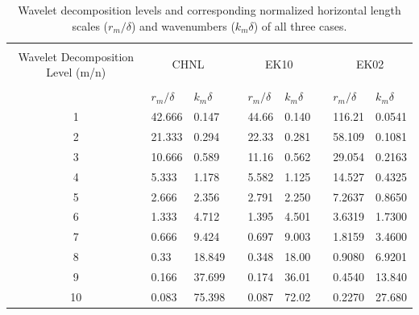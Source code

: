 \begin{table}
	  \caption{Wavelet decomposition levels and corresponding normalized horizontal length scales ($r_m/\delta$) and wavenumbers ($k_m\delta$) of all three cases.}	
	    \centering
		\begin{tabular}{cllllllll}
		\hline \hline\\
		Wavelet Decomposition Level (m/n) &  \multicolumn{2}{c}{CHNL} &  & \multicolumn{2}{c}{EK10} & & \multicolumn{2}{c}{EK02}\\
		\hline \\
		{}   & {$r_{m}/\delta$}   & {$k_m\delta$}  &   & {$r_{m}/\delta$}    & {$k_{m}\delta$} &  & {$r_{m}/\delta$}   & {$k_{m}\delta$} \\
		1  & 42.666 & 0.147   &   &  44.66    & 0.140  &  & 116.21    & 0.0541 \\ 
		2  & 21.333 & 0.294   &   &  22.33    & 0.281  &  & 58.109    & 0.1081 \\
		3  & 10.666 & 0.589   &   &  11.16    & 0.562  &  & 29.054    & 0.2163 \\
		4  & 5.333  & 1.178   &   &  5.582    & 1.125  &  & 14.527    & 0.4325 \\
		5  & 2.666  & 2.356   &   &  2.791    & 2.250  &  & 7.2637    & 0.8650 \\
		6  & 1.333  & 4.712   &   &  1.395    & 4.501  &  & 3.6319    & 1.7300 \\
		7  & 0.666  & 9.424   &   &  0.697    & 9.003  &  & 1.8159    & 3.4600 \\
		8  & 0.33   & 18.849  &   &  0.348    & 18.00  &  & 0.9080    & 6.9201 \\
		9  & 0.166  & 37.699  &   &  0.174    & 36.01  &  & 0.4540    & 13.840 \\
		10 & 0.083  & 75.398  &   &  0.087    & 72.02  &  & 0.2270    & 27.680 \\
		\hline\hline
		\end{tabular}	
	
	\label{tab:wav-mode2scale}
\end{table}
\graphicspath{{chap2Img/}}
